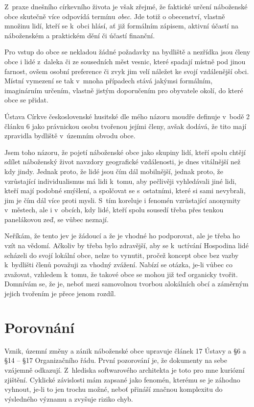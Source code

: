 Z~praxe dnešního církevního života je však zřejmé, že faktické určení náboženské
obce skutečně více odpovídá termínu \textit{obec}. Jde totiž o obecenství,
vlastně množinu lidí, kteří se k~obci hlásí, ať již formálním zápisem, aktivní
účastí na náboženském a praktickém dění či účastí finanční.

Pro vstup do obce se nekladou žádné požadavky na bydliště a nezřídka jsou členy
obce i lidé z~daleka či ze sousedních měst vesnic, které spadají místně pod
jinou farnost, ovšem osobní preference či zvyk jim velí náležet ke svojí
vzdálenější obci. Místní vymezení se tak v~mnoha případech stává jakýmsi
formálním, imaginárním určením, vlastně jistým doporučením pro obyvatele okolí,
do které obce se přidat.

Ústava Církve československé husitské dle mého názoru moudře definuje v~bodě 2
článku 6 jako právnickou osobu tvořenou jejími členy, avšak dodává, že tito mají
zpravidla bydliště v~územním obvodu obce.

Jsem toho názoru, že pojetí náboženské obce jako skupiny lidí, kteří spolu
chtějí sdílet náboženský život navzdory geografické vzdálenosti, je dnes
vitálnější než kdy jindy. Jednak proto, že lidé jsou čím dál mobilnější, jednak
proto, že vzrůstající individualismus má lidi k~tomu, aby pečlivěji vyhledávali
jiné lidi, kteří mají podobné smýšlení, a spolčovat se s~ostatními, které si
sami nevybrali, jim je čím dál více proti mysli. S~tím koreluje i fenomén
vzrůstající anonymity v~městech, ale i v~obcích, kdy lidé, kteří spolu sousedí
třeba přes tenkou panelákovou zeď, se vůbec neznají.

Neříkám, že tento jev je žádoucí a že je vhodné ho podporovat, ale je třeba ho
vzít na vědomí. Ačkoliv by třeba bylo zdravější, aby se k~uctívání Hospodina
lidé scházeli do svojí lokální obce, nelze to vynutit, pročež koncept obce
bez vazby k~bydlišti členů považuji za vhodný zvážení. Nabízí se otázka, je-li
vůbec co zvažovat, vzhledem k~tomu, že takové obce se mohou již teď organicky
tvořit. Domnívám se, že je, neboť mezi samovolnou tvorbou alokálních obcí a
záměrným jejich tvořením je přece jenom rozdíl.

\chapter{Porovnání}

Vznik, územní změny a zánik náboženské obce upravuje článek 17 Ústavy a §6 a §14
-- §17 Organizačního řádu. První pozorování je, že dokumenty na sebe vzájemně
odkazují. Z~hlediska softwarového architekta je toto pro mne kuriózní zjištění.
Cyklické závislosti mám zapsané jako fenomén, kterému se je záhodno vyhnout,
je-li to jen trochu možné, neboť přináší značnou komplexitu do výsledného
významu a zvyšuje riziko chyb.


